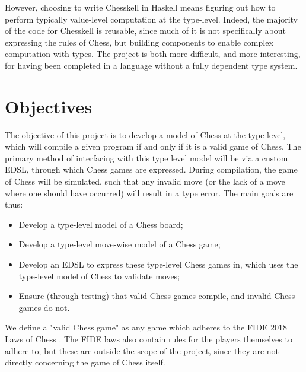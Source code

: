 However, choosing to write Chesskell in Haskell means figuring out how to perform typically value-level computation at the type-level. Indeed, the majority of the code for Chesskell is reusable, since much of it is not specifically about expressing the rules of Chess, but building components to enable complex computation with types. The project is both more difficult, and more interesting, for having been completed in a language without a fully dependent type system.

\section{Objectives}

The objective of this project is to develop a model of Chess at the type level, which will compile a given program if and only if it is a valid game of Chess. The primary method of interfacing with this type level model will be via a custom EDSL, through which Chess games are expressed. During compilation, the game of Chess will be simulated, such that any invalid move (or the lack of a move where one should have occurred) will result in a type error. The main goals are thus:

\begin{itemize}
    \item Develop a type-level model of a Chess board;
    \item Develop a type-level move-wise model of a Chess game;
    \item Develop an EDSL to express these type-level Chess games in, which uses the type-level model of Chess to validate moves;
    \item Ensure (through testing) that valid Chess games compile, and invalid Chess games do not.
\end{itemize}

We define a "valid Chess game" as any game which adheres to the FIDE 2018 Laws of Chess \cite{lawsofchess}. The FIDE laws also contain rules for the players themselves to adhere to; but these are outside the scope of the project, since they are not directly concerning the game of Chess itself.
